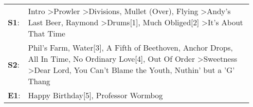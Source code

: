 \begin{supertabular}{p{0.03\textwidth}p{0.92\textwidth}}
 \textbf{S1}:  &                                                Intro\textsuperscript{} \textgreater \enspace Prowler\textsuperscript{} \textgreater \enspace Divisions\textsuperscript{}, \enspace Mullet (Over)\textsuperscript{}, \enspace Flying\textsuperscript{} \textgreater \enspace Andy's Last Beer\textsuperscript{}, \enspace Raymond\textsuperscript{} \textgreater \enspace Drums[1]\textsuperscript{}, \enspace Much Obliged[2]\textsuperscript{} \textgreater \enspace It's About That Time\textsuperscript{}  \enspace  \\
 \textbf{S2}:  &  Phil's Farm\textsuperscript{}, \enspace Water[3]\textsuperscript{}, \enspace A Fifth of Beethoven\textsuperscript{}, \enspace Anchor Drops\textsuperscript{}, \enspace All In Time\textsuperscript{}, \enspace No Ordinary Love[4]\textsuperscript{}, \enspace Out Of Order\textsuperscript{} \textgreater \enspace Sweetness\textsuperscript{} \textgreater \enspace Dear Lord\textsuperscript{}, \enspace You Can't Blame the Youth\textsuperscript{}, \enspace Nuthin' but a 'G' Thang\textsuperscript{}  \enspace  \\
 \textbf{E1}:  &                                                                                                                                                                                                                                                                                                                                                                                                                            Happy Birthday[5]\textsuperscript{}, \enspace Professor Wormbog\textsuperscript{}  \enspace  \\
\end{supertabular}
